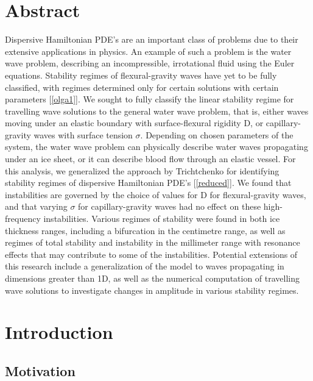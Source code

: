 \documentclass{article}
\begin{document}
\section{Abstract}

Dispersive Hamiltonian PDE's are an important class of problems due to their extensive applications in physics. An example of such a problem is the water wave problem, describing an incompressible, irrotational fluid using the Euler equations. Stability regimes of flexural-gravity waves have yet to be fully classified, with regimes determined only for certain solutions with certain parameters [\ref{olga1}]. We sought to fully classify the linear stability regime for travelling wave solutions to the general water wave problem, that is, either waves moving under an elastic boundary with surface-flexural rigidity D, or capillary-gravity waves with surface tension \(\sigma\). Depending on chosen parameters of the system, the water wave problem can physically describe water waves propagating under an ice sheet, or it can describe blood flow through an elastic vessel. For this analysis, we generalized the approach by Trichtchenko for identifying stability regimes of dispersive Hamiltonian PDE’s [\ref{reduced}]. We found that instabilities are governed by the choice of values for D for flexural-gravity waves, and that varying \(\sigma\) for capillary-gravity waves had no effect on these high-frequency instabilities. Various regimes of stability were found in both ice thickness ranges, including a bifurcation in the centimetre range, as well as regimes of total stability and instability in the millimeter range with resonance effects that may contribute to some of the instabilities. Potential extensions of this research include a generalization of the model to waves propagating in dimensions greater than 1D, as well as the numerical computation of travelling wave solutions to investigate changes in amplitude in various stability regimes. 
\clearpage 


\section{Introduction}



\subsection{Motivation}
\end{document}
